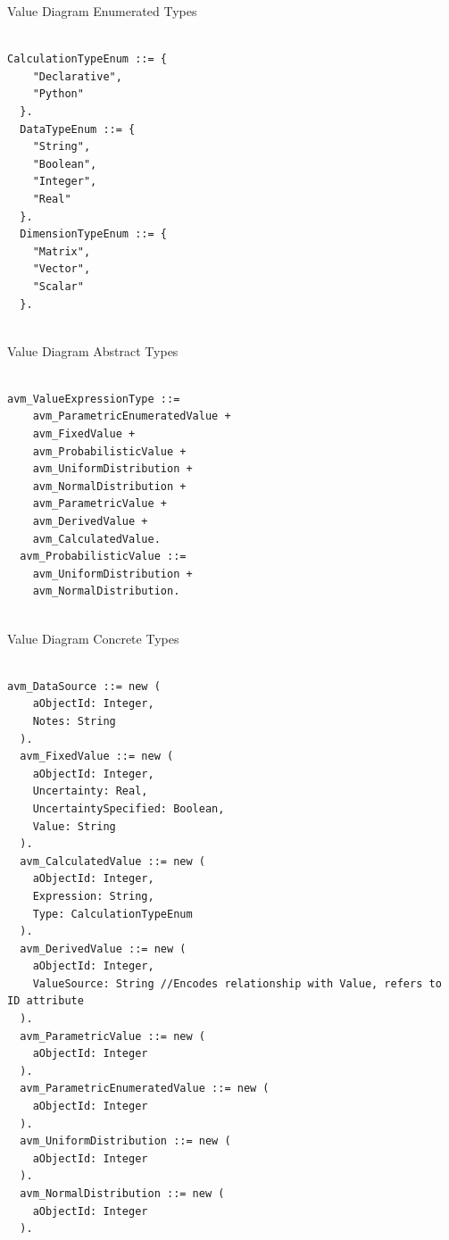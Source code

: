 Value Diagram Enumerated Types
\begin{lstlisting}

CalculationTypeEnum ::= {
    "Declarative",
    "Python"
  }.
  DataTypeEnum ::= {
    "String",
    "Boolean",
    "Integer",
    "Real"
  }.
  DimensionTypeEnum ::= {
    "Matrix",
    "Vector",
    "Scalar"
  }.


\end{lstlisting}

Value Diagram Abstract Types
\begin{lstlisting}

avm_ValueExpressionType ::=
    avm_ParametricEnumeratedValue +
    avm_FixedValue +
    avm_ProbabilisticValue +
    avm_UniformDistribution +
    avm_NormalDistribution +
    avm_ParametricValue +
    avm_DerivedValue +
    avm_CalculatedValue.
  avm_ProbabilisticValue ::=
    avm_UniformDistribution +
    avm_NormalDistribution.


\end{lstlisting}

Value Diagram Concrete Types
\begin{lstlisting}

avm_DataSource ::= new (
    aObjectId: Integer,
    Notes: String
  ).
  avm_FixedValue ::= new (
    aObjectId: Integer,
    Uncertainty: Real,
    UncertaintySpecified: Boolean,
    Value: String
  ).
  avm_CalculatedValue ::= new (
    aObjectId: Integer,
    Expression: String,
    Type: CalculationTypeEnum
  ).
  avm_DerivedValue ::= new (
    aObjectId: Integer,
    ValueSource: String //Encodes relationship with Value, refers to ID attribute
  ).
  avm_ParametricValue ::= new (
    aObjectId: Integer
  ).
  avm_ParametricEnumeratedValue ::= new (
    aObjectId: Integer
  ).
  avm_UniformDistribution ::= new (
    aObjectId: Integer
  ).
  avm_NormalDistribution ::= new (
    aObjectId: Integer
  ).


\end{lstlisting}

